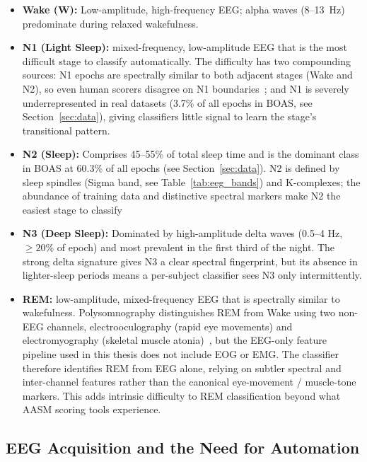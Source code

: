 \begin{itemize}
\item \textbf{Wake (W):} Low-amplitude, high-frequency EEG; alpha waves
 (8--13~Hz) predominate during relaxed wakefulness.

\item \textbf{N1 (Light Sleep):} mixed-frequency, low-amplitude EEG that is 
the most difficult stage to classify automatically. The difficulty has two 
compounding sources: N1 epochs are spectrally similar to both adjacent stages 
(Wake and N2), so even human scorers disagree on N1 boundaries~\cite{rosenberg2013aasm}; 
and N1 is severely underrepresented in real datasets (3.7\% of all epochs in BOAS, 
see Section~\ref{sec:data}), giving classifiers little signal to learn the stage's transitional pattern.

\item \textbf{N2 (Sleep):} Comprises 45–55\% of total sleep time and is the 
dominant class in BOAS at 60.3\% of all epochs (see Section~\ref{sec:data}). 
N2 is defined by sleep spindles (Sigma band, see Table~\ref{tab:eeg_bands}) 
and K-complexes; the abundance of training data and distinctive spectral markers 
make N2 the easiest stage to classify

\item \textbf{N3 (Deep Sleep):} Dominated by high-amplitude delta waves (0.5--4 Hz, $\geq 20\%$ of epoch)
and most prevalent in the first third of the night. The strong delta signature 
gives N3 a clear spectral fingerprint, but its absence in lighter-sleep periods 
means a per-subject classifier sees N3 only intermittently.

\item \textbf{REM:} low-amplitude, mixed-frequency EEG that is spectrally 
similar to wakefulness. Polysomnography distinguishes REM from Wake using 
two non-EEG channels, electrooculography (rapid eye movements) and 
electromyography (skeletal muscle atonia)~\cite{berry2020aasm}, but the 
EEG-only feature pipeline used in this thesis does not include EOG or EMG. 
The classifier therefore identifies REM from EEG alone, relying on subtler 
spectral and inter-channel features rather than the canonical eye-movement / 
muscle-tone markers. This adds intrinsic difficulty to REM classification 
beyond what AASM scoring tools experience.
\end{itemize}

\subsection{EEG Acquisition and the Need for Automation}

